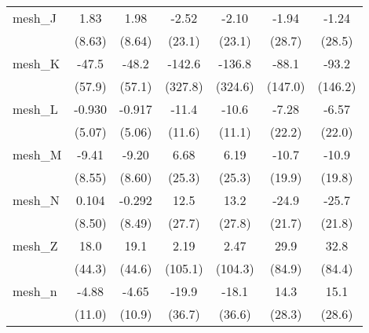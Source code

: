 \begin{tabular}{lcccccc}
   mesh\_J                                                     & 1.83         & 1.98          & -2.52         & -2.10          & -1.94          & -1.24\\   
                                                               & (8.63)       & (8.64)        & (23.1)        & (23.1)         & (28.7)         & (28.5)\\   
   mesh\_K                                                     & -47.5        & -48.2         & -142.6        & -136.8         & -88.1          & -93.2\\   
                                                               & (57.9)       & (57.1)        & (327.8)       & (324.6)        & (147.0)        & (146.2)\\   
   mesh\_L                                                     & -0.930       & -0.917        & -11.4         & -10.6          & -7.28          & -6.57\\   
                                                               & (5.07)       & (5.06)        & (11.6)        & (11.1)         & (22.2)         & (22.0)\\   
   mesh\_M                                                     & -9.41        & -9.20         & 6.68          & 6.19           & -10.7          & -10.9\\   
                                                               & (8.55)       & (8.60)        & (25.3)        & (25.3)         & (19.9)         & (19.8)\\   
   mesh\_N                                                     & 0.104        & -0.292        & 12.5          & 13.2           & -24.9          & -25.7\\   
                                                               & (8.50)       & (8.49)        & (27.7)        & (27.8)         & (21.7)         & (21.8)\\   
   mesh\_Z                                                     & 18.0         & 19.1          & 2.19          & 2.47           & 29.9           & 32.8\\   
                                                               & (44.3)       & (44.6)        & (105.1)       & (104.3)        & (84.9)         & (84.4)\\   
   mesh\_n                                                     & -4.88        & -4.65         & -19.9         & -18.1          & 14.3           & 15.1\\   
                                                               & (11.0)       & (10.9)        & (36.7)        & (36.6)         & (28.3)         & (28.6)\\   

\end{tabular}
